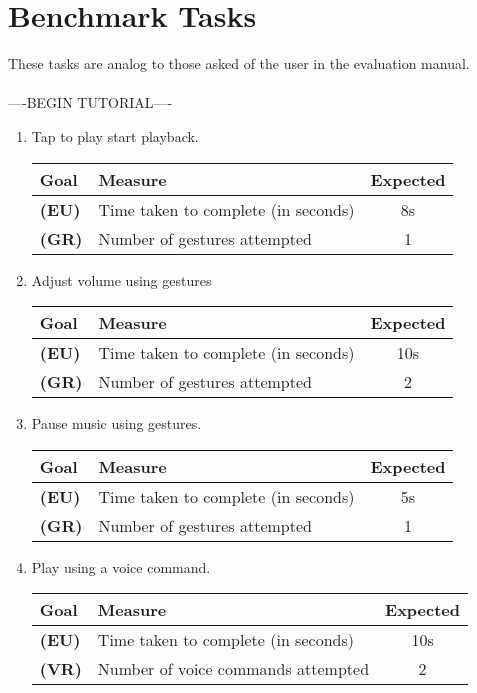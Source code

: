 \documentclass[12pt,letterpaper]{article}
\begin{document}
\section{Benchmark Tasks}
These tasks are analog to those asked of the user in the evaluation manual.
 \\ \\ ----BEGIN TUTORIAL---- \\
\begin{enumerate}
\item Tap to play start playback. 
\begin{center}\begin{tabular}{l|l|c}
\textbf{Goal} & \textbf{Measure} & \textbf{Expected} \\
\hline
\textbf{(EU)} & Time taken to complete (in seconds) & 8s \\
\hline
\textbf{(GR)} & Number of gestures attempted & 1 \\
\hline
\end{tabular}\end{center}

\item Adjust volume using gestures
\begin{center}\begin{tabular}{l|l|c}
\textbf{Goal} & \textbf{Measure} & \textbf{Expected} \\
\hline
\textbf{(EU)} & Time taken to complete (in seconds) & 10s \\
\hline
\textbf{(GR)} & Number of gestures attempted & 2 \\
\hline
\end{tabular}\end{center}

\item Pause music using gestures.
\begin{center}\begin{tabular}{l|l|c}
\textbf{Goal} & \textbf{Measure} & \textbf{Expected} \\
\hline
\textbf{(EU)} & Time taken to complete (in seconds) & 5s \\
\hline
\textbf{(GR)} & Number of gestures attempted & 1 \\
\hline
\end{tabular}\end{center}

\item Play using a voice command.
\begin{center}\begin{tabular}{l|l|c}
\textbf{Goal} & \textbf{Measure} & \textbf{Expected} \\
\hline
\textbf{(EU)} & Time taken to complete (in seconds) & 10s \\
\hline
\textbf{(VR)} & Number of voice commands attempted & 2 \\
\hline
\end{tabular}\end{center}


\end{enumerate}
\end{document}
